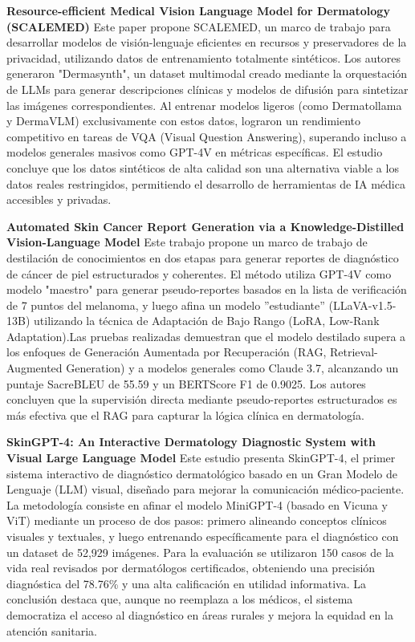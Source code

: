 \documentclass[11pt, a4paper]{article}
\begin{document}
\textbf{Resource-efficient Medical Vision Language Model for Dermatology (SCALEMED)} \cite{yilmaz_resource-efficient_nodate}
Este paper propone SCALEMED, un marco de trabajo para desarrollar modelos de visión-lenguaje eficientes en recursos y preservadores de la privacidad, utilizando datos de entrenamiento totalmente 
sintéticos. Los autores generaron "Dermasynth", un dataset multimodal creado mediante la orquestación de LLMs para generar descripciones clínicas y modelos de difusión para sintetizar las imágenes
correspondientes. Al entrenar modelos ligeros (como Dermatollama y DermaVLM) exclusivamente con estos datos, lograron un rendimiento competitivo en tareas de VQA (Visual Question Answering), superando
incluso a modelos generales masivos como GPT-4V en métricas específicas. El estudio concluye que los datos sintéticos de alta calidad son una alternativa viable a los datos reales restringidos, permitiendo
el desarrollo de herramientas de IA médica accesibles y privadas.

\textbf{Automated Skin Cancer Report Generation via a Knowledge-Distilled Vision-Language Model} \cite{chakrabarti_automated_2025}
Este trabajo propone un marco de trabajo de destilación de conocimientos en dos etapas para generar reportes de diagnóstico de cáncer de piel estructurados y coherentes.
El método utiliza GPT-4V como modelo "maestro" para generar pseudo-reportes basados en la lista de verificación de 7 puntos del melanoma, y luego afina un modelo ''estudiante'' (LLaVA-v1.5-13B) utilizando la
técnica de Adaptación de Bajo Rango (LoRA, Low-Rank Adaptation).Las pruebas realizadas demuestran que el modelo destilado supera a los enfoques de Generación Aumentada por Recuperación 
(RAG, Retrieval-Augmented Generation) y a modelos generales como Claude 3.7, alcanzando un puntaje SacreBLEU de 55.59 y un BERTScore F1 de 0.9025. Los autores concluyen que la supervisión directa mediante 
pseudo-reportes estructurados es más efectiva que el RAG para capturar la lógica clínica en dermatología.

\textbf{SkinGPT-4: An Interactive Dermatology Diagnostic System with Visual Large Language Model} \cite{zhou_skingpt-4_2023}
Este estudio presenta SkinGPT-4, el primer sistema interactivo de diagnóstico dermatológico basado en un Gran Modelo de Lenguaje (LLM) visual, diseñado para mejorar la comunicación médico-paciente.
La metodología consiste en afinar el modelo MiniGPT-4 (basado en Vicuna y ViT) mediante un proceso de dos pasos: primero alineando conceptos clínicos visuales y textuales, y luego entrenando específicamente
para el diagnóstico con un dataset de 52,929 imágenes. Para la evaluación se utilizaron 150 casos de la vida real revisados por dermatólogos certificados, obteniendo una precisión diagnóstica del 78.76\% y
una alta calificación en utilidad informativa. La conclusión destaca que, aunque no reemplaza a los médicos, el sistema democratiza el acceso al diagnóstico en áreas rurales y mejora la equidad en la atención 
sanitaria.
\end{document}
